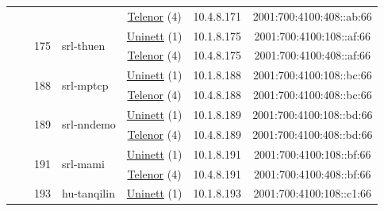 \begin{small}
\begin{center}
\begin{longtable}{|c|c|c|c|c|c|c|c|}
  &  &  &  & \multicolumn{2}{|c|}{\tiny{\href{https://www.telenor.no}{Telenor} (4)}} & \tiny{10.4.8.171} & \tiny{2001:700:4100:408::ab:66} \\* \cline{3-3}\cline{4-4}\cline{5-5}\cline{6-6}\cline{7-7}\cline{8-8}
  &  & \multirow{2}{*}{\tiny{175}} & \multicolumn{1}{|l|}{\multirow{2}{*}{\tiny{srl-thuen}}} & \multicolumn{2}{|c|}{\tiny{\href{https://www.uninett.no}{Uninett} (1)}} & \tiny{10.1.8.175} & \tiny{2001:700:4100:108::af:66} \\* \cline{5-5}\cline{6-6}\cline{7-7}\cline{8-8}
  &  &  &  & \multicolumn{2}{|c|}{\tiny{\href{https://www.telenor.no}{Telenor} (4)}} & \tiny{10.4.8.175} & \tiny{2001:700:4100:408::af:66} \\* \cline{3-3}\cline{4-4}\cline{5-5}\cline{6-6}\cline{7-7}\cline{8-8}
  &  & \multirow{2}{*}{\tiny{188}} & \multicolumn{1}{|l|}{\multirow{2}{*}{\tiny{srl-mptcp}}} & \multicolumn{2}{|c|}{\tiny{\href{https://www.uninett.no}{Uninett} (1)}} & \tiny{10.1.8.188} & \tiny{2001:700:4100:108::bc:66} \\* \cline{5-5}\cline{6-6}\cline{7-7}\cline{8-8}
  &  &  &  & \multicolumn{2}{|c|}{\tiny{\href{https://www.telenor.no}{Telenor} (4)}} & \tiny{10.4.8.188} & \tiny{2001:700:4100:408::bc:66} \\* \cline{3-3}\cline{4-4}\cline{5-5}\cline{6-6}\cline{7-7}\cline{8-8}
  &  & \multirow{2}{*}{\tiny{189}} & \multicolumn{1}{|l|}{\multirow{2}{*}{\tiny{srl-nndemo}}} & \multicolumn{2}{|c|}{\tiny{\href{https://www.uninett.no}{Uninett} (1)}} & \tiny{10.1.8.189} & \tiny{2001:700:4100:108::bd:66} \\* \cline{5-5}\cline{6-6}\cline{7-7}\cline{8-8}
  &  &  &  & \multicolumn{2}{|c|}{\tiny{\href{https://www.telenor.no}{Telenor} (4)}} & \tiny{10.4.8.189} & \tiny{2001:700:4100:408::bd:66} \\* \cline{3-3}\cline{4-4}\cline{5-5}\cline{6-6}\cline{7-7}\cline{8-8}
  &  & \multirow{2}{*}{\tiny{191}} & \multicolumn{1}{|l|}{\multirow{2}{*}{\tiny{srl-mami}}} & \multicolumn{2}{|c|}{\tiny{\href{https://www.uninett.no}{Uninett} (1)}} & \tiny{10.1.8.191} & \tiny{2001:700:4100:108::bf:66} \\* \cline{5-5}\cline{6-6}\cline{7-7}\cline{8-8}
  &  &  &  & \multicolumn{2}{|c|}{\tiny{\href{https://www.telenor.no}{Telenor} (4)}} & \tiny{10.4.8.191} & \tiny{2001:700:4100:408::bf:66} \\* \cline{3-3}\cline{4-4}\cline{5-5}\cline{6-6}\cline{7-7}\cline{8-8}
  &  & \multirow{2}{*}{\tiny{193}} & \multicolumn{1}{|l|}{\multirow{2}{*}{\tiny{hu-tanqilin}}} & \multicolumn{2}{|c|}{\tiny{\href{https://www.uninett.no}{Uninett} (1)}} & \tiny{10.1.8.193} & \tiny{2001:700:4100:108::c1:66} \\* \cline{5-5}\cline{6-6}\cline{7-7}\cline{8-8}

\end{longtable}
\end{center}
\end{small}
